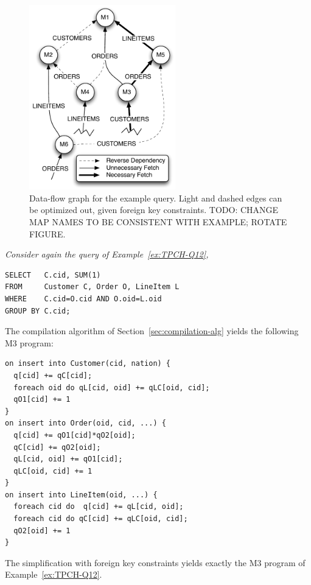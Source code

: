 \begin{figure}
\begin{center}
\includegraphics[width=2.5in]{images/q12_graph.pdf}
\caption{Data-flow graph for the example query.  Light and dashed edges can be optimized out, given foreign key constraints.
TODO: CHANGE MAP NAMES TO BE CONSISTENT WITH EXAMPLE; ROTATE FIGURE.}
\label{fig:dataflow}
\end{center}
\end{figure}


\begin{example}\em
Consider again the query of Example~\ref{ex:TPCH-Q12},
\begin{verbatim}
SELECT   C.cid, SUM(1)
FROM     Customer C, Order O, LineItem L
WHERE    C.cid=O.cid AND O.oid=L.oid
GROUP BY C.cid;
\end{verbatim}

The compilation algorithm of Section~\ref{sec:compilation-alg} yields the
following M3 program:
\begin{verbatim}
on insert into Customer(cid, nation) {
  q[cid] += qC[cid];
  foreach oid do qL[cid, oid] += qLC[oid, cid];
  qO1[cid] += 1
}
on insert into Order(oid, cid, ...) {
  q[cid] += qO1[cid]*qO2[oid];
  qC[cid] += qO2[oid];
  qL[cid, oid] += qO1[cid];
  qLC[oid, cid] += 1
}
on insert into LineItem(oid, ...) {
  foreach cid do  q[cid] += qL[cid, oid];
  foreach cid do qC[cid] += qLC[oid, cid];
  qO2[oid] += 1
}
\end{verbatim}
The simplification with foreign key constraints yields exactly the
M3 program of Example~\ref{ex:TPCH-Q12}.
\punto
\end{example}





